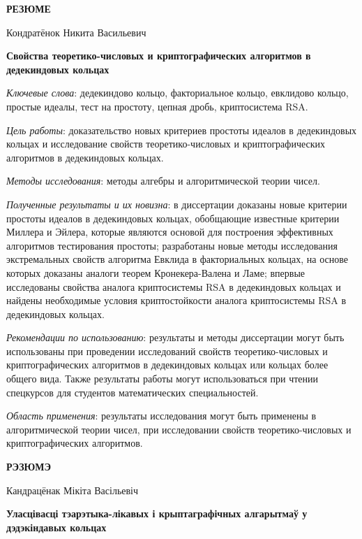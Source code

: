 \documentclass[_00_autoref.tex]{subfiles}
\begin{document}
\newpage
\centerline{\textbf{РЕЗЮМЕ}}

\vspace{-0.3ex}
\begin{center}
Кондратёнок Никита Васильевич

\textbf{Свойства теоретико-числовых и криптографических алгоритмов в дедекиндовых кольцах}
\end{center}
\vspace{-0.3ex}

\textit{Ключевые слова}:
дедекиндово кольцо, факториальное кольцо, евклидово кольцо, простые идеалы, тест на простоту, цепная дробь, криптосистема RSA.

\textit{Цель работы}:
доказательство новых критериев простоты идеалов в дедекиндовых кольцах и исследование свойств теоретико-числовых и криптографических алгоритмов в дедекиндовых кольцах.

\textit{Методы исследования}:
методы алгебры и алгоритмической теории чисел.

\textit{Полученные результаты и их новизна}:
в диссертации доказаны новые критерии простоты идеалов в дедекиндовых кольцах, обобщающие известные критерии Миллера и Эйлера, которые являются основой для построения эффективных алгоритмов тестирования простоты; разработаны новые методы исследования экстремальных свойств алгоритма Евклида в факториальных кольцах, на основе которых доказаны аналоги теорем Кронекера-Валена и Ламе; впервые исследованы свойства аналога криптосистемы RSA в дедекиндовых кольцах и найдены необходимые условия криптостойкости аналога криптосистемы RSA в дедекиндовых кольцах.

\textit{Рекомендации по использованию}:
результаты и методы диссертации могут быть использованы при проведении исследований свойств теоретико-числовых и криптографических алгоритмов в дедекиндовых кольцах или кольцах более общего вида.
Также результаты работы могут использоваться при чтении спецкурсов для студентов математических специальностей.

\textit{Область применения}:
результаты исследования могут быть применены в алгоритмической теории чисел, при исследовании свойств теоретико-числовых и криптографических алгоритмов.

\newpage
\centerline{\textbf{РЭЗЮМЭ}}

\vspace{-0.3ex}
\begin{center}
Кандрацёнак Мікіта Васільевіч

\textbf{Уласцівасці тэарэтыка-лікавых і крыптаграфічных алгарытмаў у дэдэкіндавых кольцах}
\end{center}
\vspace{-0.3ex}
\end{document}
